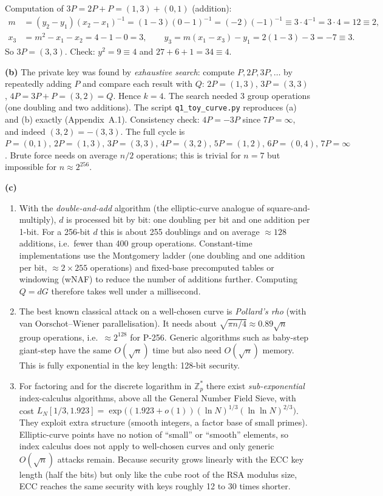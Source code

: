 \documentclass[11pt,a4paper]{article}
\begin{document}
Computation of $3P = 2P + P = (1,3)+(0,1)$ (addition):
\begin{align*}
m &= (y_2 - y_1)(x_2 - x_1)^{-1} = (1-3)(0-1)^{-1} = (-2)(-1)^{-1} \equiv 3\cdot 4^{-1} = 3\cdot 4 = 12 \equiv 2,\\
x_3 &= m^2 - x_1 - x_2 = 4 - 1 - 0 = 3, \qquad
y_3 = m(x_1 - x_3) - y_1 = 2(1-3) - 3 = -7 \equiv 3 .
\end{align*}
So $3P=(3,3)$. Check: $y^2 = 9 \equiv 4$ and $27+6+1 = 34 \equiv 4$. \checkmark

\textbf{(b)} The private key was found by \emph{exhaustive search}: compute $P, 2P, 3P, \dots$
by repeatedly adding $P$ and compare each result with $Q$:
$2P=(1,3)$, $3P=(3,3)$, $4P = 3P + P = (3,2) = Q$.
Hence $\boxed{k = 4}$. The search needed 3 group operations (one doubling and two additions).
The script \texttt{q1\_toy\_curve.py} reproduces (a) and (b) exactly (Appendix~A.1).
Consistency check: $4P = -3P$ since $7P=\infty$, and indeed $(3,2) = -(3,3)$.
The full cycle is $P=(0,1),\,2P=(1,3),\,3P=(3,3),\,4P=(3,2),\,5P=(1,2),\,6P=(0,4),\,7P=\infty$.
Brute force needs on average $n/2$ operations; this is trivial for $n=7$ but impossible for $n\approx 2^{256}$.

\textbf{(c)}
\begin{enumerate}[label=(\roman*)]
\item With the \emph{double-and-add} algorithm (the elliptic-curve analogue of square-and-multiply),
$d$ is processed bit by bit: one doubling per bit and one addition per 1-bit. For a 256-bit $d$
this is about 255 doublings and on average $\approx 128$ additions, i.e.\ fewer than 400 group operations.
Constant-time implementations use the Montgomery ladder (one doubling and one addition per bit,
$\approx 2\times 255$ operations) and fixed-base precomputed tables or windowing (wNAF) to reduce
the number of additions further. Computing $Q=dG$ therefore takes well under a millisecond.
\item The best known classical attack on a well-chosen curve is \emph{Pollard's rho}
(with van Oorschot--Wiener parallelisation). It needs about $\sqrt{\pi n/4}\approx 0.89\sqrt n$
group operations, i.e.\ $\approx 2^{128}$ for P-256. Generic algorithms such as baby-step
giant-step have the same $O(\sqrt n)$ time but also need $O(\sqrt n)$ memory.
This is fully exponential in the key length: 128-bit security.
\item For factoring and for the discrete logarithm in $\mathbb{Z}_p^*$ there exist
\emph{sub-exponential} index-calculus algorithms, above all the General Number Field Sieve,
with cost $L_N[1/3, 1.923] = \exp\big((1.923+o(1))(\ln N)^{1/3}(\ln\ln N)^{2/3}\big)$.
They exploit extra structure (smooth integers, a factor base of small primes). Elliptic-curve points
have no notion of ``small'' or ``smooth'' elements, so index calculus does not apply to
well-chosen curves and only generic $O(\sqrt n)$ attacks remain. Because security grows
linearly with the ECC key length (half the bits) but only like the cube root of the RSA modulus
size, ECC reaches the same security with keys roughly 12 to 30 times shorter.
\end{enumerate}
\end{document}
